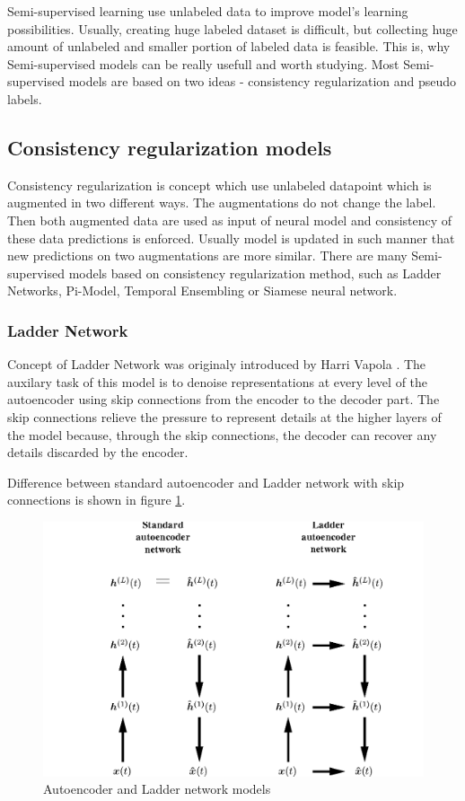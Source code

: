 Semi-supervised learning use unlabeled data to improve model's learning possibilities. Usually, creating huge labeled dataset is difficult, but collecting huge amount of unlabeled and smaller portion of labeled data is feasible. This is, why Semi-supervised models can be really usefull and worth studying. Most Semi-supervised models are based on two ideas - consistency regularization and pseudo labels. 


\subsection{Consistency regularization models}

Consistency regularization is concept which use unlabeled datapoint which is augmented in two different ways. The augmentations do not change the label. Then both augmented data are used as input of neural model and consistency of these data predictions is enforced. Usually model is updated in such manner that new predictions on two augmentations are more similar. There are many Semi-supervised models based on consistency regularization method, such as Ladder Networks, Pi-Model, Temporal Ensembling or Siamese neural network.

\subsubsection{Ladder Network}

Concept of Ladder Network was originaly introduced by Harri Vapola \cite{valpola2015}. 
The auxilary task of this model is to denoise representations at every level of the autoencoder using skip connections from the encoder to the decoder part. The skip connections relieve the pressure
to represent details at the higher layers of the model because, through the skip connections, the
decoder can recover any details discarded by the encoder. \cite{Rasmus2015} 

Difference between standard autoencoder and Ladder network with skip connections is shown in figure \ref{fig:ladder}.

\begin{figure}[h!]
    \centering
    \includegraphics[width=1\textwidth]{figs/ladder.png}
    \caption{Autoencoder and Ladder network models \cite{valpola2015} }
    \label{fig:ladder}
\end{figure}

